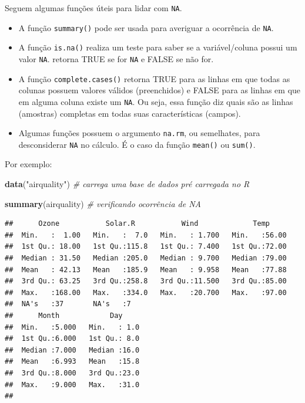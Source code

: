 \documentclass[]{book}
\newenvironment{Shaded}{\begin{snugshade}}{\end{snugshade}}
\newcommand{\KeywordTok}[1]{\textcolor[rgb]{0.13,0.29,0.53}{\textbf{#1}}}
\newcommand{\StringTok}[1]{\textcolor[rgb]{0.31,0.60,0.02}{#1}}
\newcommand{\CommentTok}[1]{\textcolor[rgb]{0.56,0.35,0.01}{\textit{#1}}}
\newcommand{\NormalTok}[1]{#1}
\providecommand{\tightlist}{%
  \setlength{\itemsep}{0pt}\setlength{\parskip}{0pt}}
\begin{document}
Seguem algumas funções úteis para lidar com \texttt{NA}.

\begin{itemize}
\tightlist
\item
  A função \texttt{summary()} pode ser usada para averiguar a ocorrência
  de \texttt{NA}.
\item
  A função \texttt{is.na()} realiza um teste para saber se a
  variável/coluna possui um valor \texttt{NA}. retorna TRUE se for
  \texttt{NA} e FALSE se não for.
\item
  A função \texttt{complete.cases()} retorna TRUE para as linhas em que
  todas as colunas possuem valores válidos (preenchidos) e FALSE para as
  linhas em que em alguma coluna existe um \texttt{NA}. Ou seja, essa
  função diz quais são as linhas (amostras) completas em todas suas
  características (campos).
\item
  Algumas funções possuem o argumento \texttt{na.rm}, ou semelhates,
  para desconsiderar \texttt{NA} no cálculo. É o caso da função
  \texttt{mean()} ou \texttt{sum()}.
\end{itemize}

Por exemplo:

\begin{Shaded}
\begin{Highlighting}[]
\KeywordTok{data}\NormalTok{(}\StringTok{"airquality"}\NormalTok{) }\CommentTok{# carrega uma base de dados pré carregada no R}
\end{Highlighting}
\end{Shaded}

\begin{Shaded}
\begin{Highlighting}[]
\KeywordTok{summary}\NormalTok{(airquality) }\CommentTok{# verificando ocorrência de NA}
\end{Highlighting}
\end{Shaded}

\begin{verbatim}
##      Ozone           Solar.R           Wind             Temp      
##  Min.   :  1.00   Min.   :  7.0   Min.   : 1.700   Min.   :56.00  
##  1st Qu.: 18.00   1st Qu.:115.8   1st Qu.: 7.400   1st Qu.:72.00  
##  Median : 31.50   Median :205.0   Median : 9.700   Median :79.00  
##  Mean   : 42.13   Mean   :185.9   Mean   : 9.958   Mean   :77.88  
##  3rd Qu.: 63.25   3rd Qu.:258.8   3rd Qu.:11.500   3rd Qu.:85.00  
##  Max.   :168.00   Max.   :334.0   Max.   :20.700   Max.   :97.00  
##  NA's   :37       NA's   :7                                       
##      Month            Day      
##  Min.   :5.000   Min.   : 1.0  
##  1st Qu.:6.000   1st Qu.: 8.0  
##  Median :7.000   Median :16.0  
##  Mean   :6.993   Mean   :15.8  
##  3rd Qu.:8.000   3rd Qu.:23.0  
##  Max.   :9.000   Max.   :31.0  
## 
\end{verbatim}
\end{document}
